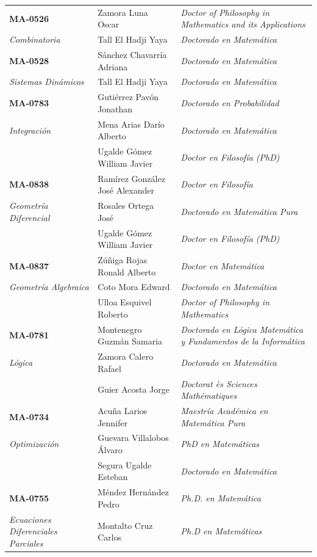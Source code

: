 \begin{landscape}
\begin{longtable}{|>{\columncolor{Celeste-UCR!12}\raggedright\arraybackslash}p{6cm}|>{\raggedright\arraybackslash}p{6.6cm}|>{\raggedright\arraybackslash}p{7.6cm}|}
\hline
\textbf{MA-0526} & Zamora Luna Oscar & \textit{Doctor of Philosophy in Mathematics and its Applications} \\
\textit{Combinatoria} & Tall El Hadji Yaya & \textit{Doctorado en Matemática} \\
\hline
\textbf{MA-0528} & Sánchez Chavarría Adriana & \textit{Doctorado en Matemática} \\
\textit{Sistemas Dinámicos} & Tall El Hadji Yaya & \textit{Doctorado en Matemática} \\
\hline
\textbf{MA-0783} & Gutiérrez Pavón Jonathan & \textit{Doctorado en Probabilidad} \\
\textit{Integración} & Mena Arias Darío Alberto & \textit{Doctorado en Matemática} \\
 & Ugalde Gómez William Javier & \textit{Doctor en Filosofía (PhD)} \\
\hline
\textbf{MA-0838} & Ramírez González José Alexander & \textit{Doctor en Filosofía} \\
\textit{Geometría Diferencial} & Rosales Ortega José & \textit{Doctorado en Matemática Pura} \\
 & Ugalde Gómez William Javier & \textit{Doctor en Filosofía (PhD)} \\
\hline
\textbf{MA-0837} & Zúñiga Rojas Ronald Alberto & \textit{Doctor en Matemática} \\
\textit{Geometría Algebraica} & Coto Mora Edward & \textit{Doctorado en Matemática} \\
 & Ulloa Esquivel Roberto & \textit{Doctor of Philosophy in Mathematics} \\
\hline
\textbf{MA-0781} & Montenegro Guzmán Samaria & \textit{Doctorado en Lógica Matemática y Fundamentos de la Informática} \\
\textit{Lógica} & Zamora Calero Rafael & \textit{Doctorado en Matemática} \\
 & Guier Acosta Jorge & \textit{Doctorat ès Sciences Mathématiques} \\
\hline
\textbf{MA-0734} & Acuña Larios Jennifer & \textit{Maestría Académica en Matemática Pura} \\
\textit{Optimización} & Guevara Villalobos Álvaro & \textit{PhD en Matemáticas} \\
 & Segura Ugalde Esteban & \textit{Doctorado en Matemática} \\
\hline
\textbf{MA-0755} & Méndez Hernández Pedro & \textit{Ph.D. en Matemática} \\
\textit{Ecuaciones Diferenciales Parciales} & Montalto Cruz Carlos & \textit{Ph.D en Matemáticas} \\

\end{longtable}
\end{landscape}
